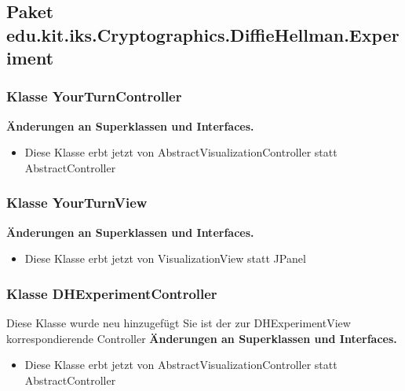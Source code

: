 \documentclass{article}
\begin{document}
  \subsection{Paket edu.kit.iks.Cryptographics.DiffieHellman.Experiment}

	\subsubsection{Klasse YourTurnController}
	    \textbf{Änderungen an Superklassen und Interfaces.}\newline
        \begin{itemize}
            \item Diese Klasse erbt jetzt von AbstractVisualizationController statt AbstractController\newline
        \end{itemize}

	\subsubsection{Klasse YourTurnView}
	    \textbf{Änderungen an Superklassen und Interfaces.}\newline
        \begin{itemize}
            \item Diese Klasse erbt jetzt von VisualizationView statt JPanel\newline
        \end{itemize}

	\subsubsection{Klasse DHExperimentController}
    Diese Klasse wurde neu hinzugefügt
    Sie ist der zur DHExperimentView korrespondierende Controller
	    \textbf{Änderungen an Superklassen und Interfaces.}\newline
        \begin{itemize}
            \item Diese Klasse erbt jetzt von AbstractVisualizationController statt AbstractController\newline
        \end{itemize}
\end{document}
